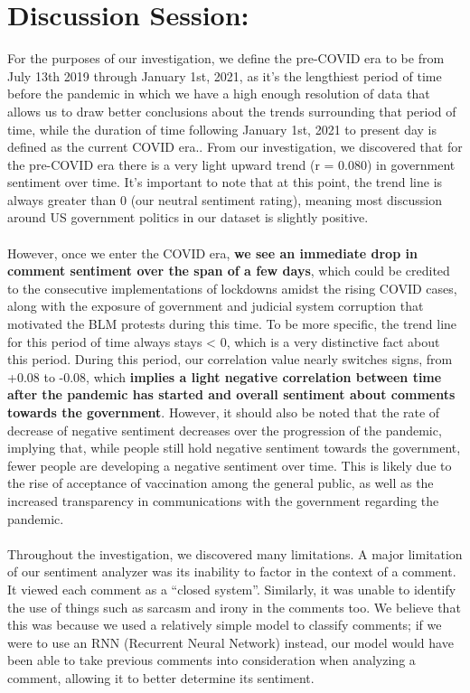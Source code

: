 \documentclass[fontsize=11pt]{article}
\begin{document}
\section*{Discussion Session:}
For the purposes of our investigation, we define the pre-COVID era to be from July 13th 2019 through January 1st, 2021, as it’s the lengthiest period of time before the pandemic in which we have a high enough resolution of data that allows us to draw better conclusions about the trends surrounding that period of time, while the duration of time following January 1st, 2021 to present day is defined as the current COVID era.. From our investigation, we discovered that for the pre-COVID era there is a very light upward trend (r = 0.080) in government sentiment over time. It’s important to note that at this point, the trend line is always greater than 0 (our neutral sentiment rating), meaning most discussion around US government politics in our dataset is slightly positive.
\\\\
However, once we enter the COVID era, \textbf{we see an immediate drop in comment sentiment over the span of a few days}, which could be credited to the consecutive implementations of lockdowns amidst the rising COVID cases, along with the exposure of government and judicial system corruption that motivated the BLM protests during this time. To be more specific, the trend line for this period of time always stays < 0, which is a very distinctive fact about this period. During this period, our correlation value nearly switches signs, from +0.08 to -0.08, which \textbf{implies a light negative correlation between time after the pandemic has started and overall sentiment about comments towards the government}. However, it should also be noted that the rate of decrease of negative sentiment decreases over the progression of the pandemic, implying that, while people still hold negative sentiment towards the government, fewer people are developing a negative sentiment over time. This is likely due to the rise of acceptance of vaccination among the general public, as well as the increased transparency in communications with the government regarding the pandemic. 
\\\\
Throughout the investigation, we discovered many limitations. A major limitation of our sentiment analyzer was its inability to factor in the context of a comment. It viewed each comment as a “closed system”. Similarly, it was unable to identify the use of things such as sarcasm and irony in the comments too. We believe that this was because we used a relatively simple model to classify comments; if we were to use an RNN (Recurrent Neural Network) instead, our model would have been able to take previous comments into consideration when analyzing a comment, allowing it to better determine its sentiment. 
\end{document}
